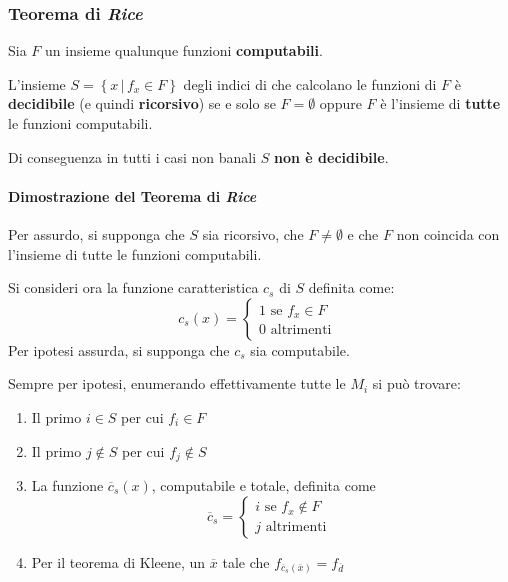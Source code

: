 \documentclass[italian, 10pt]{article}
\begin{document}
\subsubsection{Teorema di \textit{Rice}}

Sia \(F\) un insieme qualunque funzioni \textbf{computabili}.

L'insieme \(S = \left\{ x \, | \, f_x \in F \right\}\) degli indici di \TM che calcolano le funzioni di \(F\) è \textbf{decidibile} (e quindi \textbf{ricorsivo}) se e solo se \(F = \emptyset\) oppure \(F\) è l'insieme di \textbf{tutte} le funzioni computabili.

Di conseguenza in tutti i casi non banali \(S\) \textbf{non è decidibile}.

\paragraph{Dimostrazione del Teorema di \textit{Rice}}

Per assurdo, si supponga che \(S\) sia ricorsivo, che \(F \neq \emptyset\) e che \(F\) non coincida con l'insieme di tutte le funzioni computabili.

Si consideri ora la funzione caratteristica \(c_s\) di \(S\) definita come:
\[ c_s(x) = \begin{cases}
    1 \text{ se } f_x \in F \\
    0 \text{ altrimenti }
  \end{cases} \]
Per ipotesi assurda, si supponga che \(c_s\) sia computabile.

Sempre per ipotesi, enumerando effettivamente tutte le \TM \(M_i\) si può trovare:
\begin{enumerate}[label=\alph*), ref=(\Alph*)]
  \item \label{enum:dimostrazione-rice-1} Il primo \(i \in S\) per cui \(f_i \in F\)
  \item \label{enum:dimostrazione-rice-2} Il primo \(j \notin S\) per cui \(f_j \notin S\)
  \item \label{enum:dimostrazione-rice-3} La funzione \(\overline{c}_s(x)\), computabile e totale, definita come
        \[ \overline{c}_s = \begin{cases}
            i \text{ se } f_x \notin F \\
            j \text{ altrimenti }
          \end{cases} \]
  \item \label{enum:dimostrazione-rice-4} Per il teorema di Kleene, un \(\overline{x}\) tale che \(f_{\overline{c}_s(\overline{x})} = f_{\overline{d}}\)
\end{enumerate}
\end{document}
